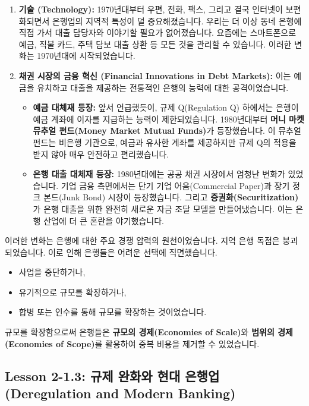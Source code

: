 \documentclass[11pt,a4paper]{book}
\theoremstyle{definition}
\begin{document}
\begin{enumerate}
    \item \textbf{기술 (Technology):}
    1970년대부터 우편, 전화, 팩스, 그리고 결국 인터넷이 보편화되면서 은행업의 지역적 특성이 덜 중요해졌습니다. 우리는 더 이상 동네 은행에 직접 가서 대출 담당자와 이야기할 필요가 없어졌습니다. 요즘에는 스마트폰으로 예금, 직불 카드, 주택 담보 대출 상환 등 모든 것을 관리할 수 있습니다. 이러한 변화는 1970년대에 시작되었습니다.

    \item \textbf{채권 시장의 금융 혁신 (Financial Innovations in Debt Markets):}
    이는 예금을 유치하고 대출을 제공하는 전통적인 은행의 능력에 대한 공격이었습니다.
    \begin{itemize}
        \item \textbf{예금 대체재 등장:} 앞서 언급했듯이, 규제 Q(Regulation Q) 하에서는 은행이 예금 계좌에 이자를 지급하는 능력이 제한되었습니다. 1980년대부터 \textbf{머니 마켓 뮤추얼 펀드(Money Market Mutual Funds)}가 등장했습니다. 이 뮤추얼 펀드는 비은행 기관으로, 예금과 유사한 계좌를 제공하지만 규제 Q의 적용을 받지 않아 매우 안전하고 편리했습니다.
        \item \textbf{은행 대출 대체재 등장:} 1980년대에는 공공 채권 시장에서 엄청난 변화가 있었습니다. 기업 금융 측면에서는 단기 기업 어음(Commercial Paper)과 장기 정크 본드(Junk Bond) 시장이 등장했습니다. 그리고 \textbf{증권화(Securitization)}가 은행 대출을 위한 완전히 새로운 자금 조달 모델을 만들어냈습니다. 이는 은행 산업에 더 큰 혼란을 야기했습니다.
    \end{itemize}
\end{enumerate}

이러한 변화는 은행에 대한 주요 경쟁 압력의 원천이었습니다. 지역 은행 독점은 붕괴되었습니다. 이로 인해 은행들은 어려운 선택에 직면했습니다.
\begin{itemize}
    \item 사업을 중단하거나,
    \item 유기적으로 규모를 확장하거나,
    \item 합병 또는 인수를 통해 규모를 확장하는 것이었습니다.
\end{itemize}
규모를 확장함으로써 은행들은 \textbf{규모의 경제(Economies of Scale)}와 \textbf{범위의 경제(Economies of Scope)}를 활용하여 중복 비용을 제거할 수 있었습니다.


\subsection{Lesson 2-1.3: 규제 완화와 현대 은행업 (Deregulation and Modern Banking)}
\end{document}
